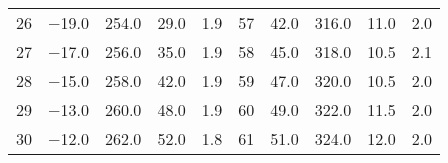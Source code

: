 \begin{table}
\begin{tabular}{S S S S S | S S S S S}
        \num{26} &  \num{-19.0} &  \num{254.0} &  \num{29.0} &  \num{1.9} & \num{57} &  \num{ 42.0} &  \num{316.0} &  \num{11.0} &  \num{2.0} \\
        \num{27} &  \num{-17.0} &  \num{256.0} &  \num{35.0} &  \num{1.9} & \num{58} &  \num{ 45.0} &  \num{318.0} &  \num{10.5} &  \num{2.1} \\
        \num{28} &  \num{-15.0} &  \num{258.0} &  \num{42.0} &  \num{1.9} & \num{59} &  \num{ 47.0} &  \num{320.0} &  \num{10.5} &  \num{2.0} \\
        \num{29} &  \num{-13.0} &  \num{260.0} &  \num{48.0} &  \num{1.9} & \num{60} &  \num{ 49.0} &  \num{322.0} &  \num{11.5} &  \num{2.0} \\
        \num{30} &  \num{-12.0} &  \num{262.0} &  \num{52.0} &  \num{1.8} & \num{61} &  \num{ 51.0} &  \num{324.0} &  \num{12.0} &  \num{2.0} \\
      \bottomrule
    \end{tabular}
  \end{table}

